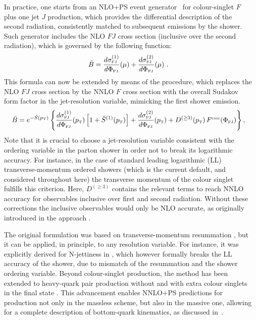 \documentclass[11pt,a4paper]{article}
\begin{document}
In practice, one starts from an NLO+PS \POWHEG{} event
generator~\cite{alioli:2010xd} for colour-singlet $F$ plus one jet $J$
production, which provides the differential description of the 
second radiation, consistently matched to subsequent emissions
by the shower. Such generator includes the NLO $FJ$ cross section 
(inclusive over the second radiation), which is governed by the following
function:
\begin{equation}
  \bar{B} = \frac{d\sigma_{\scriptscriptstyle\rm
      FJ}^{(1)}}{d\Phi_{\scriptscriptstyle\rm FJ}}\!\left(\mu\right) +
  \frac{d\sigma_{\scriptscriptstyle\rm
      FJ}^{(2)}}{d\Phi_{\scriptscriptstyle\rm FJ}}\!\left(\mu\right)\,.
\end{equation}
This formula can now be extended by means of the \minnlo{} procedure,
which replaces the NLO $FJ$ cross section by the NNLO $F$ cross section
with the overall Sudakov form factor in the jet-resolution variable, mimicking
the first shower emission.
\begin{equation}
  \label{MiNNLOPS_cross_section}
  \bar{B} = e^{-\tilde{S}\left(p_{\scriptscriptstyle\rm T}\right)}
  \left\{\frac{d\sigma_{\scriptscriptstyle\rm
      FJ}^{(1)}}{d\Phi_{\scriptscriptstyle\rm
      FJ}}\!\left(p_{\scriptscriptstyle\rm T}\right) \left[1 +
    \tilde{S}^{(1)}\!\left(p_{\scriptscriptstyle\rm T}\right)\right] +
  \frac{d\sigma_{\scriptscriptstyle\rm
      FJ}^{(2)}}{d\Phi_{\scriptscriptstyle\rm
      FJ}}\!\left(p_{\scriptscriptstyle\rm T}\right) + D^{(\geq
    3)}\!\left(p_{\scriptscriptstyle\rm T}\right)
  F^{\scriptscriptstyle\rm corr}\!\left(\Phi_{\scriptscriptstyle\rm
    FJ}\right)\right\},
\end{equation}
Note that it is crucial to choose a jet-resolution variable 
consistent with the ordering variable in the parton shower in order not to break
its logarithmic accuracy. For instance, in the case of standard leading logarithmic (LL) 
transverse-momentum ordered showers (which is the current default, and 
considered throughout here) the transverse 
momentum of the colour singlet fulfills this criterion.
Here, $D^{(\geq 3)}$ contains the relevant terms to reach 
NNLO accuracy for observables inclusive over first and second radiation.
Without these corrections the inclusive observables would only be NLO accurate,
as originally introduced in the \minlo{} approach \cite{}.

The original \minnlo{} formulation was based on transverse-momentum resummation \cite{Monni:2019whf,Monni:2020nks}, but it 
can be applied, in principle, to any resolution variable. For instance, it was explicitly derived for N-jettiness in ,
which however formally breaks the LL accuracy of the shower, due to mismatch of the resummation and the shower ordering variable. 
Beyond colour-singlet production, the \minnlo{} method has been extended to heavy-quark pair production without \cite{mazzitelli:2020jio,mazzitelli:2021mmm}
and with extra colour singlets in the final state \cite{mazzitelli:2024ura}. This advancement enables NNLO+PS predictions for \bbH{} production
not only in the massless scheme, but also in the massive one, allowing for a complete description of bottom-quark kinematics, as discussed in~.
\end{document}
